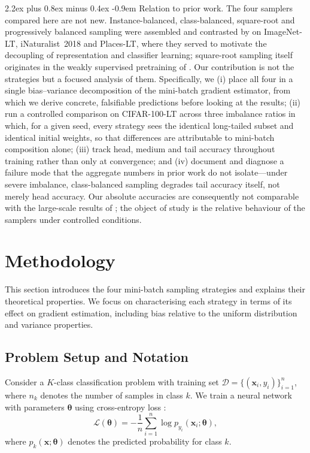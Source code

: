 \documentclass[12pt,a4paper]{article}
\makeatletter
\renewcommand{\paragraph}{\@startsection{paragraph}{4}{\z@}%
  {2.2ex plus 0.8ex minus 0.4ex}%
  {-0.9em}%
  {\normalfont\normalsize\bfseries}}
\newcommand{\bx}{\mathbf{x}}
\newcommand{\btheta}{\boldsymbol{\theta}}
\makeatother
\begin{document}
\paragraph{Relation to prior work.} The four samplers compared here are not new. Instance-balanced, class-balanced, square-root and progressively balanced sampling were assembled and contrasted by \citet{kang2020decoupling} on ImageNet-LT, iNaturalist~2018 and Places-LT, where they served to motivate the decoupling of representation and classifier learning; square-root sampling itself originates in the weakly supervised pretraining of \citet{mahajan2018exploring}. Our contribution is not the strategies but a focused analysis of them. Specifically, we (i) place all four in a single bias--variance decomposition of the mini-batch gradient estimator, from which we derive concrete, falsifiable predictions before looking at the results; (ii) run a controlled comparison on CIFAR-100-LT across three imbalance ratios in which, for a given seed, every strategy sees the identical long-tailed subset and identical initial weights, so that differences are attributable to mini-batch composition alone; (iii) track head, medium and tail accuracy throughout training rather than only at convergence; and (iv) document and diagnose a failure mode that the aggregate numbers in prior work do not isolate---under severe imbalance, class-balanced sampling degrades tail accuracy itself, not merely head accuracy. Our absolute accuracies are consequently not comparable with the large-scale results of \citet{kang2020decoupling}; the object of study is the relative behaviour of the samplers under controlled conditions.

\section{Methodology}
\label{sec:methodology}
This section introduces the four mini-batch sampling strategies and explains their theoretical properties. We focus on characterising each strategy in terms of its effect on gradient estimation, including bias relative to the uniform distribution and variance properties.

\subsection{Problem Setup and Notation}
\label{subsec:setup}
Consider a $K$-class classification problem with training set $\mathcal{D} = \{(\bx_i, y_i)\}_{i=1}^{n}$, where $n_k$ denotes the number of samples in class $k$. We train a neural network with parameters $\btheta$ using cross-entropy loss \citep{bishop2006pattern}:
\begin{equation}
    \mathcal{L}(\btheta) = -\frac{1}{n} \sum_{i=1}^{n} \log p_{y_i}(\bx_i; \btheta),
    \label{eq:cross_entropy}
\end{equation}
where $p_k(\bx; \btheta)$ denotes the predicted probability for class $k$.
\end{document}
